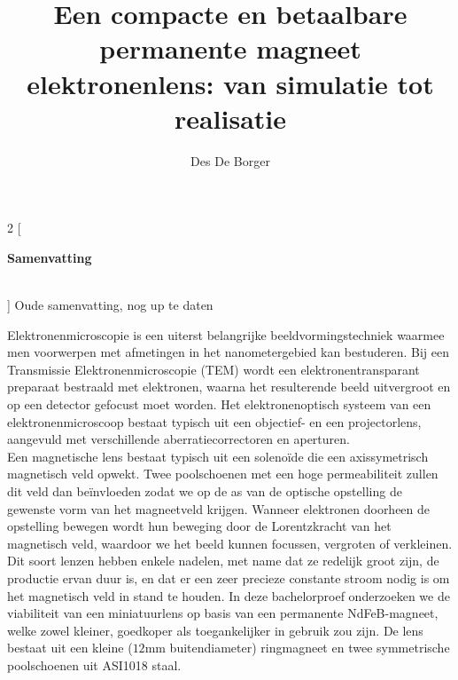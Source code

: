 \documentclass[we,twoside,openright,a4paper,11pt]{uantwerpenbamathesis}
\title{Een compacte en betaalbare permanente magneet elektronenlens: van simulatie tot realisatie} %
\subtitle{}
\author{Des De Borger}
\begin{document}
\maketitle

\frontmatter

\tableofcontents

\mainmatter

\pagestyle{empty}
\thispagestyle{empty}

\makeatletter
\begin{multicols}{2}
[
\begin{center}
\textbf{
  \Large Samenvatting\\[1ex]
  \@title\\[1ex]
  \large \@author
}
\end{center}
]
\color{red} Oude samenvatting, nog up te daten \color{black}

Elektronenmicroscopie is een uiterst belangrijke beeldvormingstechniek waarmee men voorwerpen met afmetingen in het nanometergebied kan bestuderen. Bij een Transmissie Elektronenmicroscopie (TEM) wordt een elektronentransparant preparaat bestraald met elektronen, waarna het resulterende beeld uitvergroot en op een detector gefocust moet worden. Het elektronenoptisch systeem van een elektronenmicroscoop bestaat typisch uit een objectief- en een projectorlens, aangevuld met verschillende aberratiecorrectoren en aperturen.\\

Een magnetische lens bestaat typisch uit een solenoïde die een axissymetrisch magnetisch veld opwekt. Twee poolschoenen met een hoge permeabiliteit zullen dit veld dan beïnvloeden zodat we op de as van de optische opstelling de gewenste vorm van het magneetveld krijgen. Wanneer elektronen doorheen de opstelling bewegen wordt hun beweging door de Lorentzkracht van het magnetisch veld, waardoor we het beeld kunnen focussen, vergroten of verkleinen.\\

Dit soort lenzen hebben enkele nadelen, met name dat ze redelijk groot zijn, de productie ervan duur is, en dat er een zeer precieze constante stroom nodig is om het magnetisch veld in stand te houden. In deze bachelorproef onderzoeken we de viabiliteit van een miniatuurlens op basis van een permanente NdFeB-magneet, welke zowel kleiner, goedkoper als toegankelijker in gebruik zou zijn. De lens bestaat uit een kleine ($12\text{mm}$ buitendiameter) ringmagneet en twee symmetrische poolschoenen uit ASI1018 staal.\\


\end{multicols}
\end{document}
